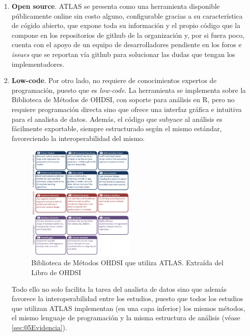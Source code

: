 \begin{enumerate}[label=\roman*.]

    \item \textbf{Open source}. ATLAS se presenta como una herramienta disponible públicamente online sin costo alguno, configurable gracias a su característica de cógido abierto, que expone toda su información y el propio código que la compone en los repositorios de github de la organización y, por si fuera poco, cuenta con el apoyo de un equipo de desarrolladores pendiente en los foros e \textit{issues} que se reportan vía github para solucionar las dudas que tengan los implementadores. 

    \item \textbf{Low-code}. Por otro lado, no requiere de conocimientos expertos de programación, puesto que es \textit{low-code}. La herramienta se implementa sobre la Biblioteca de Métodos de OHDSI, con soporte para análisis en R, pero no requiere programación directa sino que ofrece una interfaz gráfica e intuitiva para el analista de datos. Además, el código que subyace al análisis es fácilmente exportable, siempre estructurado según el mismo estándar, favoreciendo la interoperabilidad del mismo.

\begin{figure}[H]
\centering
\includegraphics[width=0.50\textwidth]{figures/methodsLibrary.png}
\caption{Biblioteca de Métodos OHDSI que utiliza ATLAS. Extraída del Libro de OHDSI \cite{OHDSIbook}}
\label{fig:methodsLibrary}
\end{figure}
    
     Todo ello no solo facilita la tarea del analista de datos sino que además favorece la interoperabilidad entre los estudios, puesto que todos los estudios que utilizan ATLAS implementan (en una capa inferior) los mismos métodos, el mismo lenguaje de programación y la misma estructura de análisis (véase \ref{sec:05Evidencia}). 


\end{enumerate}
